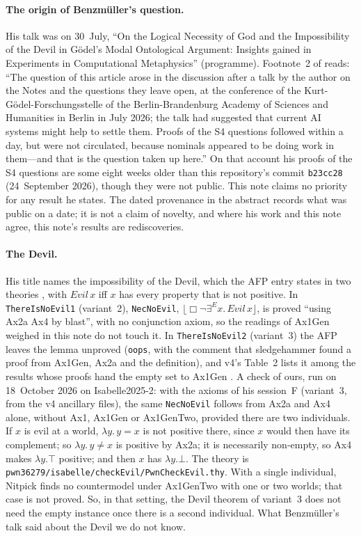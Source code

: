 \documentclass[11pt,a4paper]{article}
\newcommand{\valid}[1]{\lfloor #1 \rfloor}
\newcommand{\Nec}{\Box}
\newcommand{\exE}{\exists^{E}}
\newcommand{\lean}[1]{\texttt{#1}}
\theoremstyle{definition}
\theoremstyle{remark}
\begin{document}
\paragraph{The origin of Benzm\"uller's question.}
His talk was on 30~July, ``On the Logical Necessity of God and the
Impossibility of the Devil in G\"odel's Modal Ontological Argument: Insights
gained in Experiments in Computational Metaphysics'' (programme).
Footnote~2 of \cite[v3 and v4]{benzmuellerPWN2026} reads: ``The question of
this article arose in the discussion after a talk by the author on the Notes
and the questions they leave open, at the conference of the
Kurt-G\"odel-Forschungsstelle of the Berlin-Brandenburg Academy of Sciences
and Humanities in Berlin in July 2026; the talk had suggested that current AI
systems might help to settle them. Proofs of the S4 questions followed within
a day, but were not circulated, because nominals appeared to be doing work in
them---and that is the question taken up here.''
On that account his proofs of the S4 questions are some eight weeks older
than this repository's commit \lean{b23cc28} (24~September 2026), though
they were not public.
This note claims no priority for any result he states.
The dated provenance in the abstract records what was public on a date; it
is not a claim of novelty, and where his work and this note agree, this
note's results are rediscoveries.

\paragraph{The Devil.}
His title names the impossibility of the Devil, which the AFP entry states
in two theories \cite{afpNotes2025}, with \(\mathit{Evil}\,x\) iff \(x\) has every
property that is not positive.
In \lean{ThereIsNoEvil1} (variant~2), \lean{NecNoEvil},
\(\valid{\Nec\neg\exE x.\,\mathit{Evil}\,x}\), is proved ``using Ax2a Ax4 by
blast'', with no conjunction axiom, so the readings of Ax1Gen weighed in this
note do not touch it.
In \lean{ThereIsNoEvil2} (variant~3) the AFP leaves the lemma unproved
(\lean{oops}, with the comment that sledgehammer found a proof from Ax1Gen,
Ax2a and the definition), and v4's Table~2 lists it among the results whose proofs hand
the empty set to Ax1Gen \cite[v4]{benzmuellerPWN2026}.
A check of ours, run on 18~October 2026 on Isabelle2025-2: with the axioms of
his session~F (variant~3, from the v4 ancillary files), the same
\lean{NecNoEvil} follows from Ax2a and Ax4 alone, without Ax1, Ax1Gen or
Ax1GenTwo, provided there are two individuals.
If \(x\) is evil at a world, \(\lambda y.\,y=x\) is not positive there, since
\(x\) would then have its complement; so \(\lambda y.\,y\neq x\) is positive
by Ax2a; it is necessarily non-empty, so Ax4 makes \(\lambda y.\top\)
positive; and then \(x\) has \(\lambda y.\bot\).
The theory is \lean{pwn36279/isabelle/checkEvil/PwnCheckEvil.thy}.
With a single individual, Nitpick finds no countermodel under Ax1GenTwo with
one or two worlds; that case is not proved.
So, in that setting, the Devil theorem of variant~3 does not need the empty
instance once there is a second individual.
What Benzm\"uller's talk said about the Devil we do not know.
\end{document}
